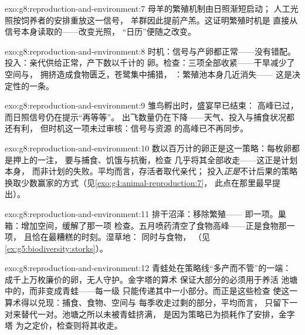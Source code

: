 \begin{solution}{exo:g8:reproduction-and-environment:7}
母羊的繁殖机制由日照渐短启动；
人工光照按饲养者的安排重放这一信号，
羊群因此提前产羔。这证明繁殖时机是
直接从信号本身读取的——改变光照，
“日历”便随之改变。
\end{solution}

\begin{solution}{exo:g8:reproduction-and-environment:8}
时机：信号与产卵都正常——没有错配。
投入：亲代供给正常，产下数以千计的
卵。检查：三项全部收紧——干旱减少了空间与，
拥挤造成食物匮乏，苍鹭集中捕猎，
：繁殖池本身几近消失——
这是决定性的一条。
\end{solution}

\begin{solution}{exo:g8:reproduction-and-environment:9}
雏鸟孵出时，盛宴早已结束：
高峰已过，而日照信号仍在提示“再等等”。
出飞数量仍在下降——天气、投入与捕食状况都还有利，
但时机这一项未过审核：信号与资源
的高峰已不再同步。
\end{solution}

\begin{solution}{exo:g8:reproduction-and-environment:10}
数以百万计的卵正是这一策略：每枚卵都是押上的一注，
要与捕食、饥饿与抗衡，检查
几乎将其全部收走——这正是计划本身，
而非计划的失败。平均而言，存活者取代亲代；
投入\emph{正是}不计后果的策略
换取少数赢家的方式（见\cref{exo:g4:animal-reproduction:7}，
此点在那里最早提出）。
\end{solution}

\begin{solution}{exo:g8:reproduction-and-environment:11}
排干沼泽：移除繁殖——
即一项。巢箱：增加空间，缓解了那一项
检查。五月喷药清空了食物高峰——正是食物那一项，
且恰在最糟糕的时刻。湿草地：
同时与食物，
（见\cref{ex:g5:biodiversity:storks}）。
\end{solution}

\begin{solution}{exo:g8:reproduction-and-environment:12}
青蛙处在策略线“多产而不管”的一端：
成千上万枚廉价的卵，无人守护。金字塔的算术
保证大部分的必须用于养活
池塘中的，而非变成青蛙——每一级
只能传递其中一小部分。而正是这些检查
使这一算术得以兑现：捕食、食物、空间与
每季收走过剩的部分，平均而言，
只留下一对来替代一对。池塘之所以未被青蛙挤满，
是因为策略已为损耗作了安排，金字塔
为之定价，检查则将其收走。
\end{solution}

